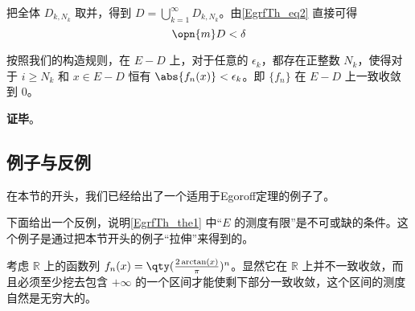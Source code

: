 把全体 $D_{k, N_k}$ 取并，得到 $D=\bigcup_{k=1}^\infty D_{k, N_k}$。由\autoref{EgrfTh_eq2} 直接可得
\begin{equation}
\opn{m}D<\delta
\end{equation}

按照我们的构造规则，在 $E-D$ 上，对于任意的 $\epsilon_k$，都存在正整数 $N_k$，使得对于 $i\geq N_k$ 和 $x\in E-D$ 恒有 $\abs{f_n(x)}<\epsilon_k$。即 $\{f_n\}$ 在 $E-D$ 上一致收敛到 $0$。

\textbf{证毕}。


\subsection{例子与反例}

在本节的开头，我们已经给出了一个适用于Egoroff定理的例子了。

下面给出一个反例，说明\autoref{EgrfTh_the1} 中“$E$ 的测度有限”是不可或缺的条件。这个例子是通过把本节开头的例子“拉伸”来得到的。


\begin{example}{}

考虑 $\mathbb{R}$ 上的函数列 $f_n(x)=\qty(\frac{2\arctan(x)}{\pi})^n$。显然它在 $\mathbb{R}$ 上并不一致收敛，而且必须至少挖去包含 $+\infty$ 的一个区间才能使剩下部分一致收敛，这个区间的测度自然是无穷大的。

\end{example}















